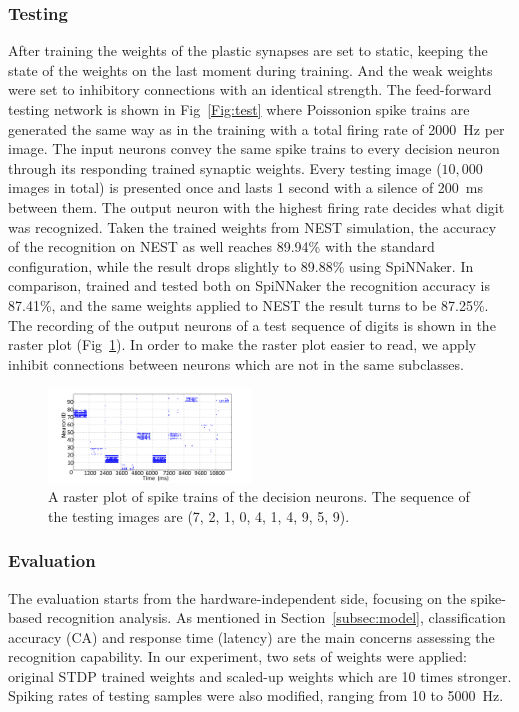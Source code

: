 \subsubsection{Testing}
After training the weights of the plastic synapses are set to static, keeping the state of the weights on the last moment during training.
And the weak weights were set to inhibitory connections with an identical strength.
The feed-forward testing network is shown in Fig~\ref{Fig:test} where Poissonion spike trains are generated the same way as in the training with a total firing rate of 2000~Hz per image.
The input neurons convey the same spike trains to every decision neuron through its responding trained synaptic weights. 
Every testing image ($10,000$ images in total) is presented once and lasts 1 second with a silence of 200~ms between them.
The output neuron with the highest firing rate decides what digit was recognized.
Taken the trained weights from NEST simulation, the accuracy of the recognition on NEST as well reaches 89.94\% with the standard configuration, while the result drops slightly to 89.88\% using SpiNNaker.
In comparison, trained and tested both on SpiNNaker the recognition accuracy is 87.41\%, and the same weights applied to NEST the result turns to be 87.25\%. 
The recording of the output neurons of a test sequence of digits is shown in the raster plot (Fig~\ref{Fig:output}).
In order to make the raster plot easier to read, we apply inhibit connections between neurons which are not in the same subclasses.


\begin{figure}[hbt!]
	\centering
	\includegraphics[width=0.48\textwidth]{images/decision.pdf}
	\caption{A raster plot of spike trains of the decision neurons. The sequence of the testing images are (7, 2, 1, 0, 4, 1, 4, 9, 5, 9).}
	\label{Fig:output}
\end{figure} 
\subsubsection{Evaluation}
The evaluation starts from the hardware-independent side, focusing on the spike-based recognition analysis.
As mentioned in Section~\ref{subsec:model}, classification accuracy (CA) and response time (latency) are the main concerns assessing the recognition capability.
In our experiment, two sets of weights were applied: original STDP trained weights and scaled-up weights which are 10 times stronger. Spiking rates of testing samples were also modified, ranging from 10 to 5000~Hz.

